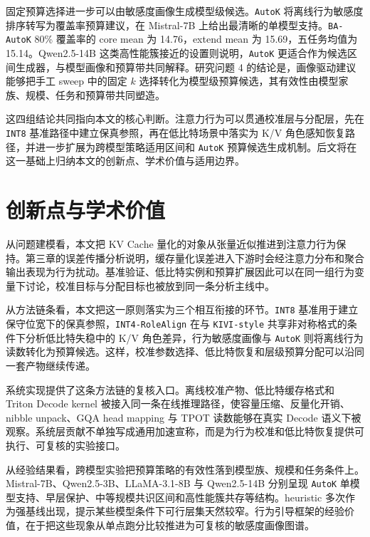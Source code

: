 固定预算选择进一步可以由敏感度画像生成模型级候选。\texttt{AutoK} 将离线行为敏感度排序转写为覆盖率预算建议，在 Mistral-7B 上给出最清晰的单模型支持。\texttt{BA-AutoK} 80\% 覆盖率的 core mean 为 14.76，extend mean 为 15.69，五任务均值为 15.14。Qwen2.5-14B 这类高性能簇接近的设置则说明，\texttt{AutoK} 更适合作为候选区间生成器，与模型画像和预算带共同解释。研究问题 4 的结论是，画像驱动建议能够把手工 sweep 中的固定 $k$ 选择转化为模型级预算候选，其有效性由模型家族、规模、任务和预算带共同塑造。

这四组结论共同指向本文的核心判断。注意力行为可以贯通校准层与分配层，先在 \texttt{INT8} 基准路径中建立保真参照，再在低比特场景中落实为 K/V 角色感知恢复路径，并进一步扩展为跨模型策略适用区间和 \texttt{AutoK} 预算候选生成机制。后文将在这一基础上归纳本文的创新点、学术价值与适用边界。

\section{创新点与学术价值}
\label{sec:ch5-innovation-value}

从问题建模看，本文把 KV Cache 量化的对象从张量近似推进到注意力行为保持。第三章的误差传播分析说明，缓存量化误差进入下游时会经注意力分布和聚合输出表现为行为扰动。基准验证、低比特实例和预算扩展因此可以在同一组行为变量下讨论，校准目标与分配目标也被放到同一条分析主线中。

从方法链条看，本文把这一原则落实为三个相互衔接的环节。\texttt{INT8} 基准用于建立保守位宽下的保真参照，\texttt{INT4-RoleAlign} 在与 \texttt{KIVI-style} 共享非对称格式的条件下分析低比特失稳中的 K/V 角色差异，行为敏感度画像与 \texttt{AutoK} 则将离线行为读数转化为预算候选。这样，校准参数选择、低比特恢复和层级预算分配可以沿同一套产物继续传递。

系统实现提供了这条方法链的复核入口。离线校准产物、低比特缓存格式和 Triton Decode kernel 被接入同一条在线推理路径，使容量压缩、反量化开销、nibble unpack、GQA head mapping 与 TPOT 读数能够在真实 Decode 语义下被观察。系统层贡献不单独写成通用加速宣称，而是为行为校准和低比特恢复提供可执行、可复核的实验接口。

从经验结果看，跨模型实验把预算策略的有效性落到模型族、规模和任务条件上。Mistral-7B、Qwen2.5-3B、LLaMA-3.1-8B 与 Qwen2.5-14B 分别呈现 \texttt{AutoK} 单模型支持、早层保护、中等规模共识区间和高性能簇共存等结构。heuristic 多次作为强基线出现，提示某些模型条件下可行层集天然较窄。行为引导框架的经验价值，在于把这些现象从单点跑分比较推进为可复核的敏感度画像图谱。

